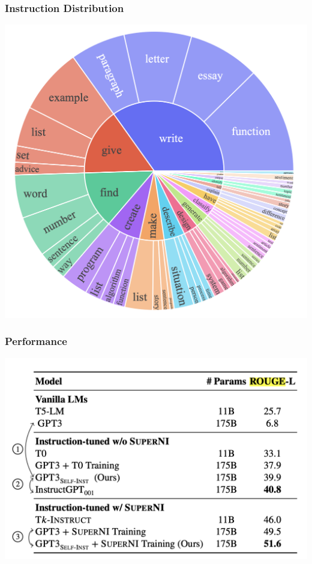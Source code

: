 \documentclass[xcolor=dvipsnames]{beamer}
\newcommand{\0}{\vec{0}}
\begin{document}
\begin{frame}
	\frametitle{Instruction Distribution}
	\begin{center}
		\includegraphics[scale=0.3]{Wang3}
	\end{center}
\end{frame}
\begin{frame}
	\frametitle{Performance}
	\begin{center}
		\includegraphics[scale=0.4]{Wang4}
	\end{center}
\end{frame}
\end{document}

